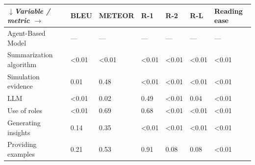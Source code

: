 \begin{tabular}{|l|l|l|l|l|l|l|}
\hline
\textit{$\downarrow$Variable / metric $\rightarrow$} & BLEU & METEOR & R-1 & R-2 & R-L & Reading ease \\
 \hline
 Agent-Based Model & — & — & — & — & — & — \\
 \hline
 Summarization algorithm & \textless{}0.01 & \textless{}0.01 & \textless{}0.01 & \textless{}0.01 & \textless{}0.01 & \textless{}0.01 \\
 \hline
 Simulation evidence & 0.01 & 0.48 & \textless{}0.01 & \textless{}0.01 & \textless{}0.01 & \textless{}0.01 \\
 \hline
 LLM & \textless{}0.01 & 0.02 & 0.49 & \textless{}0.01 & 0.04 & \textless{}0.01 \\
 \hline
 Use of roles & \textless{}0.01 & 0.69 & 0.68 & \textless{}0.01 & \textless{}0.01 & \textless{}0.01 \\
 \hline
 Generating insights & 0.14 & 0.35 & \textless{}0.01 & \textless{}0.01 & \textless{}0.01 & \textless{}0.01 \\
 \hline
 Providing examples & 0.21 & 0.53 & 0.91 & 0.08 & 0.08 & \textless{}0.01 \\
\hline
\end{tabular}
